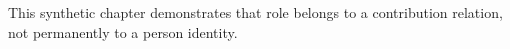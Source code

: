 This synthetic chapter demonstrates that role belongs to a contribution relation, not permanently to a person identity.
